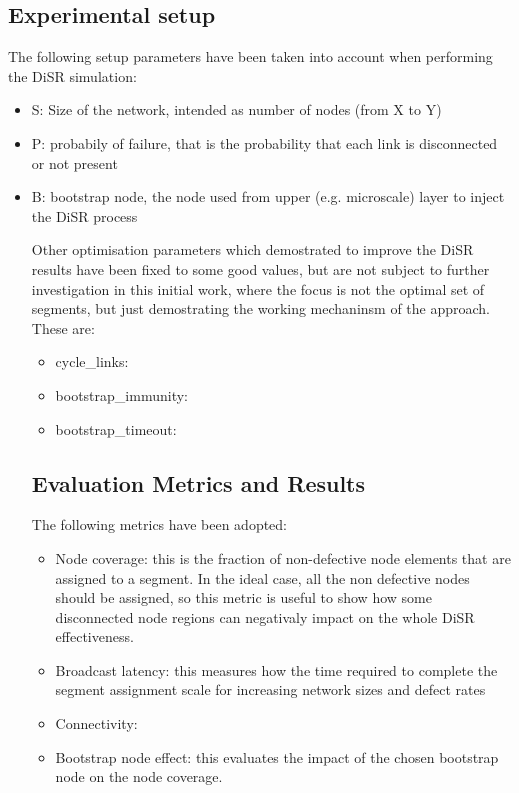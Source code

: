 \documentclass[final,journal,letterpaper]{IEEEtran}
\begin{document}
\subsection{Experimental setup}
The following setup parameters have been taken into account when
performing the DiSR simulation:
\begin{itemize}
\item {S}: Size of the network, intended as number of nodes (from X to Y)
\item {P}: probabily of failure, that is the probability that each
link is disconnected or not present 
\item {B}: bootstrap node, the node used from upper (e.g. microscale)
layer to inject the DiSR process

Other optimisation parameters which demostrated to improve the DiSR
results have been fixed to some good values, but are not subject to
further investigation in this initial work, where the focus is not the
optimal set of segments, but just demostrating the working mechaninsm
of the approach. These are:
\begin{itemize}
\item{cycle\_links}: 
\item{bootstrap\_immunity}:
\item{bootstrap\_timeout}:
\end{itemize}

\subsection{Evaluation Metrics and Results}
\label{sec:results}

The following metrics have been adopted:
\begin{itemize}
\item{Node coverage}: this is the fraction of non-defective node elements that
are assigned to a segment. In the ideal case, all the non defective
nodes should be assigned, so this metric is useful to show how some
disconnected node regions can negativaly impact on the whole DiSR
effectiveness.
\item{Broadcast latency}: this measures how the time required to complete the
segment assignment scale for increasing network sizes and defect rates
\item{Connectivity}:
\item{Bootstrap node effect}: this evaluates the impact of the chosen
bootstrap node on the node coverage.
\end{itemize}


\end{itemize}
\end{document}
